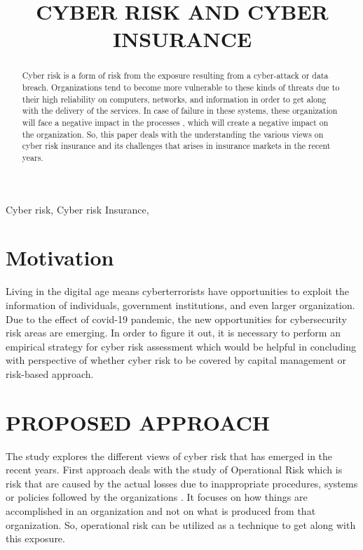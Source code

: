 \documentclass[conference]{IEEEtran}
\begin{document}
\title{CYBER RISK AND CYBER INSURANCE\\}

\author{
}

\maketitle

\begin{abstract}
Cyber risk is a form of risk from the exposure resulting from a cyber-attack or data breach. Organizations tend to become more vulnerable to these kinds of threats due to their high reliability on computers, networks, and information in order to get along with the delivery of the services. In case of failure in these systems, these organization will face a negative impact in the processes , which will create a negative impact on the organization. So, this paper deals with the understanding the various views on cyber risk insurance and its challenges that arises in insurance markets in the recent years.   
\end{abstract}

\begin{IEEEkeywords}
Cyber risk, Cyber risk Insurance, 
\end{IEEEkeywords}

\section{Motivation}
Living in the digital age means cyberterrorists have opportunities to exploit the information of individuals, government institutions, and even larger organization. Due to the effect of covid-19 pandemic, the new opportunities for cybersecurity risk areas are emerging. In order to figure it out, it is necessary to perform an empirical strategy for cyber risk assessment which would be helpful in concluding with perspective of whether cyber risk to be covered by capital management or risk-based approach.  

\section{PROPOSED APPROACH}
The study explores the different views of cyber risk that has emerged in the recent years. First approach deals with the study of Operational Risk which is risk that are caused by the actual losses due to inappropriate procedures, systems or policies followed by the organizations\cite{b1} \cite{b2}. It focuses on how things are accomplished in an organization and not on what is produced from that organization. So, operational risk can be utilized as a technique to get along with this exposure.
\end{document}
